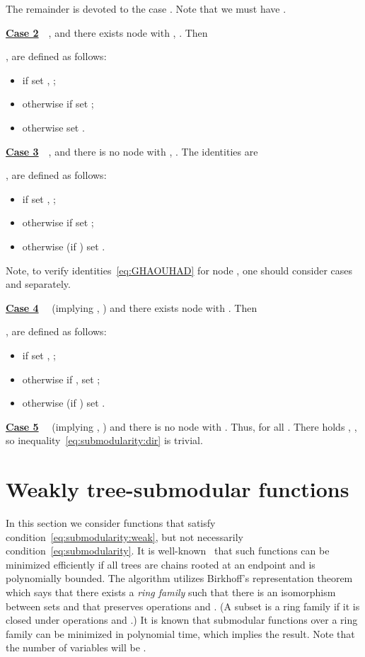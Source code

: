 \documentclass[11pt,onecolumn]{article}
\begin{document}
The remainder is devoted to the case . Note that we must have .

\vspace{3pt}
\noindent \underline{\bf Case 2}~~,  and there exists node  with , .  Then

,  are defined as follows: 
\begin{itemize}
\item if  set , ; 
\item otherwise if  set ;
\item otherwise set .
\end{itemize}

\vspace{3pt}
\noindent \underline{\bf Case 3}~~,  and there is no node  with , . 
The identities are

,  are defined as follows: 
\begin{itemize}
\item if  set , ; 
\item otherwise if  set ;
\item otherwise (if ) set .
\end{itemize}
Note, to verify identities~\eqref{eq:GHAOUHAD} for node , one should consider cases  and  separately. 


\vspace{3pt}
\noindent \underline{\bf Case 4}~~ (implying , ) and there exists node 
with . Then

,  are defined as follows: 
\begin{itemize}
\item if  set , ; 
\item otherwise if ,  set ;
\item otherwise (if ) set .
\end{itemize}


\vspace{3pt}
\noindent \underline{\bf Case 5}~~ (implying , ) and there is no node  with . 
Thus,  for all . There holds , ,
so inequality~\eqref{eq:submodularity:dir} is trivial.










\section{Weakly tree-submodular functions}\label{sec:weak}
In this section we consider functions  that satisfy condition~\eqref{eq:submodularity:weak},
but not necessarily condition~\eqref{eq:submodularity}.
It is well-known~\cite{Topkis:78,Murota:book} that such functions can be minimized efficiently 
if all trees  are chains rooted at an endpoint and  is polynomially bounded.
The algorithm utilizes Birkhoff's representation theorem~\cite{Birkhoff:37} which says that there exists a {\em ring family} 
such that there is an isomorphism between sets  and  that preserves operations  and .
(A subset  is a ring family if it is closed under operations  and .)
It is known that submodular functions over a ring family can be minimized in polynomial time, which implies the result.
Note that the number of variables will be .
\end{document}
